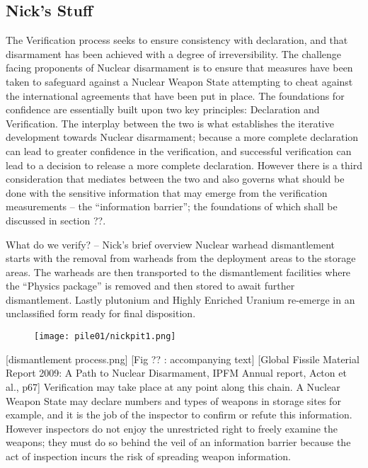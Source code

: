 \documentclass[twocolumn,a4paper]{article}
\begin{document}
\subsection{Nick's Stuff}
The Verification process seeks to ensure consistency with declaration,
and that disarmament has been achieved with a degree of
irreversibility.  The challenge facing proponents of Nuclear
disarmament is to ensure that measures have been taken to safeguard
against a Nuclear Weapon State attempting to cheat against the
international agreements that have been put in place. The foundations
for confidence are essentially built upon two key principles:
Declaration and Verification. The interplay between the two is what
establishes the iterative development towards Nuclear disarmament;
because a more complete declaration can lead to greater confidence in
the verification, and successful verification can lead to a decision
to release a more complete declaration. However there is a third
consideration that mediates between the two and also governs what
should be done with the sensitive information that may emerge from the
verification measurements -- the ``information barrier''; the
foundations of which shall be discussed in section ??.

What do we verify? -- Nick’s brief overview Nuclear warhead
dismantlement starts with the removal from warheads from the
deployment areas to the storage areas. The warheads are then
transported to the dismantlement facilities where the ``Physics
package'' is removed and then stored to await further
dismantlement. Lastly plutonium and Highly Enriched Uranium re-emerge
in an unclassified form ready for final disposition.

\begin{figure}
  \texttt{[image: pile01/nickpit1.png]}
\end{figure}

[dismantlement process.png] [Fig ?? : accompanying text] [Global
  Fissile Material Report 2009: A Path to Nuclear Disarmament, IPFM
  Annual report, Acton et al., p67] Verification may take place at any
point along this chain. A Nuclear Weapon State may declare numbers and
types of weapons in storage sites for example, and it is the job of
the inspector to confirm or refute this information.  However
inspectors do not enjoy the unrestricted right to freely examine the
weapons; they must do so behind the veil of an information barrier
because the act of inspection incurs the risk of spreading weapon
information.
\end{document}
